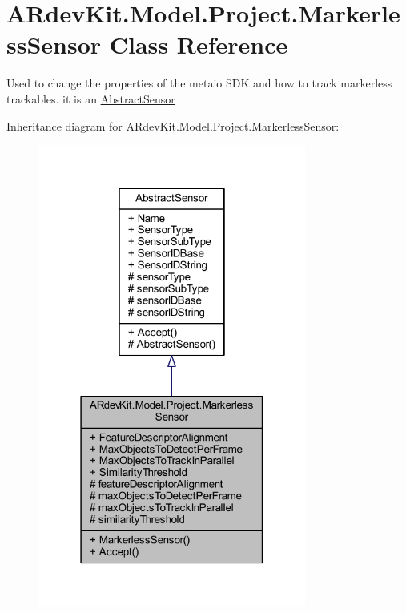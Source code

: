 \hypertarget{class_a_rdev_kit_1_1_model_1_1_project_1_1_markerless_sensor}{\section{A\-Rdev\-Kit.\-Model.\-Project.\-Markerless\-Sensor Class Reference}
\label{class_a_rdev_kit_1_1_model_1_1_project_1_1_markerless_sensor}
}


Used to change the properties of the metaio S\-D\-K and how to track markerless trackables. it is an \hyperlink{class_a_rdev_kit_1_1_model_1_1_project_1_1_abstract_sensor}{Abstract\-Sensor}  




Inheritance diagram for A\-Rdev\-Kit.\-Model.\-Project.\-Markerless\-Sensor\-:
\nopagebreak
\begin{figure}[H]
\begin{center}
\leavevmode
\includegraphics[width=250pt]{class_a_rdev_kit_1_1_model_1_1_project_1_1_markerless_sensor__inherit__graph}
\end{center}
\end{figure}


